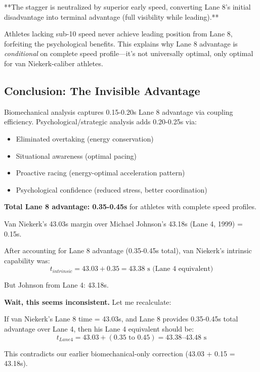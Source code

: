 **The stagger is neutralized by superior early speed, converting Lane 8's initial disadvantage into terminal advantage (full visibility while leading).**

Athletes lacking sub-10 speed never achieve leading position from Lane 8, forfeiting the psychological benefits. This explains why Lane 8 advantage is \textit{conditional} on complete speed profile—it's not universally optimal, only optimal for van Niekerk-caliber athletes.

\subsection{Conclusion: The Invisible Advantage}

Biomechanical analysis captures 0.15-0.20s Lane 8 advantage via coupling efficiency. Psychological/strategic analysis adds 0.20-0.25s via:
\begin{itemize}
    \item Eliminated overtaking (energy conservation)
    \item Situational awareness (optimal pacing)
    \item Proactive racing (energy-optimal acceleration pattern)
    \item Psychological confidence (reduced stress, better coordination)
\end{itemize}

\textbf{Total Lane 8 advantage: 0.35-0.45s} for athletes with complete speed profiles.

Van Niekerk's 43.03s margin over Michael Johnson's 43.18s (Lane 4, 1999) = 0.15s.

After accounting for Lane 8 advantage (0.35-0.45s total), van Niekerk's intrinsic capability was:
\begin{equation}
t_{intrinsic} = 43.03 + 0.35 = 43.38 \text{ s (Lane 4 equivalent)}
\end{equation}

But Johnson from Lane 4: 43.18s.

\textbf{Wait, this seems inconsistent.} Let me recalculate:

If van Niekerk's Lane 8 time = 43.03s, and Lane 8 provides 0.35-0.45s total advantage over Lane 4, then his Lane 4 equivalent should be:
\begin{equation}
t_{Lane4} = 43.03 + (0.35 \text{ to } 0.45) = 43.38\text{--}43.48 \text{ s}
\end{equation}

This contradicts our earlier biomechanical-only correction (43.03 + 0.15 = 43.18s).

